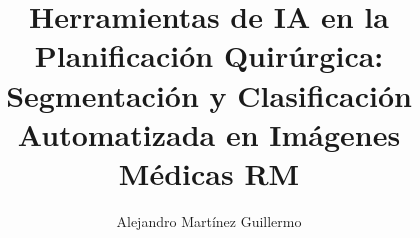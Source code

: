 



\frontmatter



\title[Herramientas de IA en la Planificación Quirúrgica]{Herramientas de IA en la Planificación Quirúrgica: Segmentación y Clasificación Automatizada en Imágenes Médicas RM}
\author[Alejandro Martínez Guillermo]{Alejandro Martínez Guillermo}


\makeatletter
